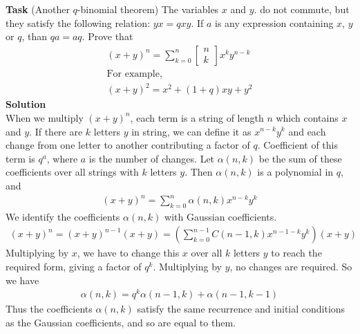 \textbf{Task}
(Another $q$-binomial theorem) The variables $x$ and $y$.
 do not commute, but they satisfy the following relation: $yx=qxy$. If $a$ is any expression containing $x$, $y$ or $q$, than $qa=aq$. Prove that
\begin{gather*}
	(x+y)^{n}=\sum_{k=0}^{n}
	\begin{bmatrix}
	n \\ k
	\end{bmatrix}
	x^k y^{n-k}\\
	\text{For example,}\\
	(x+y)^{2}=x^{2}+(1+q) x y+y^{2}	
\end{gather*}
\textbf{Solution}\\
When we multiply $(x+y)^n$, each term is a string of length $n$ which contains $x$ and $y$. If there are $k$ letters $y$ in string, we can define it as $x^{n-k}y^{k}$ and each change from one letter to another contributing a factor of $q$. Coefficient of this term is $q^{a}$, where $a$ is the number of changes. Let $\alpha(n,k)$ be the sum of these coefficients over all strings with $k$ letters $y$. Then $\alpha(n,k)$ is a polynomial in $q$, and
\begin{gather*}
	(x+y)^{n}
	=
	\sum\limits_{k=0}^{n} \alpha(n, k) x^{n-k} y^{k}	
\end{gather*}
We identify the coefficients $\alpha(n,k)$ with Gaussian coefficients.
\begin{gather*}
	(x+y)^{n}=(x+y)^{n-1}(x+y)=\left(\sum\limits_{k=0}^{n-1} C(n-1, k) x^{n-1-k} y^{k}\right)(x+y)
\end{gather*}
Multiplying by $x$, we have to change this $x$ over all $k$ letters $y$ to reach the required form, giving a factor of $q^k$. Multiplying by $y$, no changes are required. So we have
\begin{gather*}
	\alpha(n, k)
	=
	q^{k} \alpha(n-1, k) + \alpha(n-1, k-1)
\end{gather*}
Thus the coefficients $\alpha(n,k)$ satisfy the same recurrence and initial conditions as the Gaussian coefficients, and so are equal to them.